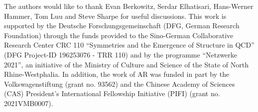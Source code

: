 \documentclass[12pt,prd,tightenlines,nofootinbib]{revtex4-2}
\begin{document}
\begin{acknowledgments}
  The authors would like to thank Evan Berkowitz, Serdar Elhatisari,
  Hans-Werner Hammer, Tom Luu
and Steve Sharpe for useful discussions.
This work is supported by the Deutsche Forschungsgemeinschaft (DFG, German Research Foundation) through the funds provided to the Sino-German Collaborative Research Center CRC 110 ``Symmetries and the Emergence of Structure in QCD''
(DFG Project-ID 196253076 -
TRR 110) and by the programme ``Netzwerke 2021'',
an initiative of the Ministry of Culture and Science of the State of North Rhine-Westphalia.
In addition, the work of AR was funded in part by the Volkswagenstiftung (grant no. 93562) and the Chinese Academy of Sciences (CAS) President’s International Fellowship Initiative (PIFI) (grant no. 2021VMB0007).
\end{acknowledgments}








\end{document}
